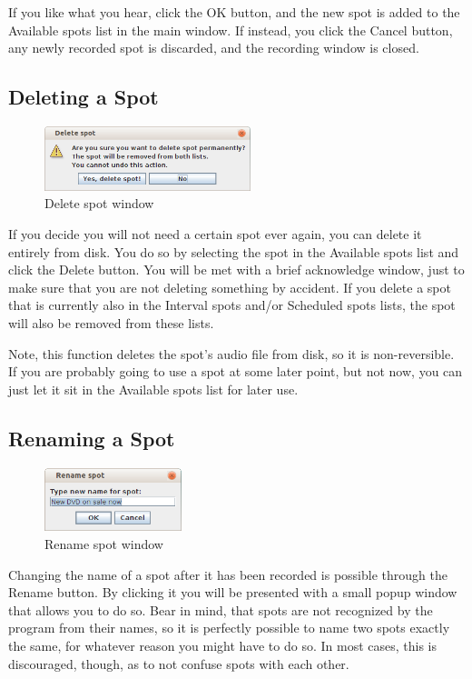 \documentclass[a4paper,12pt]{report}
\begin{document}
If you like what you hear, click the OK button, and the new spot is added to the
Available spots list in the main window. If instead, you click the Cancel
button, any newly recorded spot is discarded, and the recording window is
closed.

\subsection{Deleting a Spot}

\begin{figure}[h]
\centering \includegraphics[width=60mm]{deletespotdialogue.png}
\caption{Delete spot window}
\end{figure}

If you decide you will not need a certain spot ever again, you can delete it
entirely from disk. You do so by selecting the spot in the Available spots list
and click the Delete button. You will be met with a brief acknowledge window,
just to make sure that you are not deleting something by accident. If you delete
a spot that is currently also in the Interval spots and/or Scheduled spots
lists, the spot will also be removed from these lists.

Note, this function deletes the spot's audio file from disk, so it is
non-reversible. If you are probably going to use a spot at some later point, but
not now, you can just let it sit in the Available spots list for later use.

\subsection{Renaming a Spot}

\begin{figure}[h]
\centering \includegraphics[width=40mm]{renamespotdialogue.png}
\caption{Rename spot window}
\end{figure}

Changing the name of a spot after it has been recorded is possible through the
Rename button. By clicking it you will be presented with a small popup window
that allows you to do so. Bear in mind, that spots are not recognized by the
program from their names, so it is perfectly possible to name two spots exactly
the same, for whatever reason you might have to do so. In most cases, this is
discouraged, though, as to not confuse spots with each other.
\end{document}
